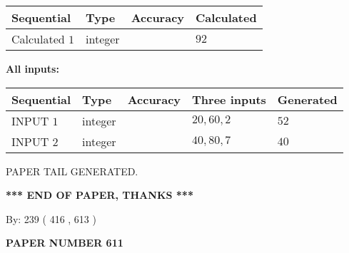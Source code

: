 \documentclass[12pt]{article}
\begin{document}
   
   
   
\noindent{}
   
   
  
  
\noindent\begin{tabular}{|l|l|l|l|}
\hline
 Sequential & Type & Accuracy & Calculated \\ 
\hline
 
 
  Calculated $  1 $ & integer &  & 
  $ 92 $ 
 \\  \hline  
 \end{tabular}
   
   
   
   
\noindent\vspace{0.1in}\hspace{-0.08in} {\textbf{\Large{All inputs: }}}
   
   
  
  
\noindent\begin{tabular}{|l|l|l|l|l|}
\hline
 Sequential & Type & Accuracy & Three inputs & Generated \\ 
\hline
 
 
  INPUT $  1 $ & integer &  & $
 20
 , 
 60
 , 
 2
 $ & $ 52 $ 
 \\  \hline  
 
 
  INPUT $  2 $ & integer &  & $
 40
 , 
 80
 , 
 7
 $ & $ 40 $ 
 \\  \hline  
 \end{tabular}
   
   
   
   
   
   
 \vspace{0.2in}
 
   
   
\vspace{2.0in} PAPER TAIL GENERATED.
   
   
   
   
\vspace{1.0in} 
{\textbf{\large{ *** END OF PAPER, THANKS *** }}} 
   
   
\hspace{1.0in} By: 
 239 ( 416 ,  613 )
   
   
   
   
\newpage 
\setcounter{page}{ 
   611001 } 
   
   
   
   
 {\textbf{ \Large{ PAPER NUMBER  611  }}}
   
\end{document}
